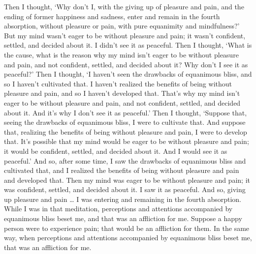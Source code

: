 \documentclass[12pt,openany]{book}%
\begin{document}
Then I thought, ‘Why don’t I, with the giving up of pleasure and pain, and the ending of former happiness and sadness, enter and remain in the fourth absorption, without pleasure or pain, with pure equanimity and mindfulness?’ But my mind wasn’t eager to be without pleasure and pain; it wasn’t confident, settled, and decided about it. I didn’t see it as peaceful. Then I thought, ‘What is the cause, what is the reason why my mind isn’t eager to be without pleasure and pain, and not confident, settled, and decided about it? Why don’t I see it as peaceful?’ Then I thought, ‘I haven’t seen the drawbacks of equanimous bliss, and so I haven’t cultivated that. I haven’t realized the benefits of being without pleasure and pain, and so I haven’t developed that. That’s why my mind isn’t eager to be without pleasure and pain, and not confident, settled, and decided about it. And it’s why I don’t see it as peaceful.’ Then I thought, ‘Suppose that, seeing the drawbacks of equanimous bliss, I were to cultivate that. And suppose that, realizing the benefits of being without pleasure and pain, I were to develop that. It’s possible that my mind would be eager to be without pleasure and pain; it would be confident, settled, and decided about it. And I would see it as peaceful.’ And so, after some time, I saw the drawbacks of equanimous bliss and cultivated that, and I realized the benefits of being without pleasure and pain and developed that. Then my mind was eager to be without pleasure and pain; it was confident, settled, and decided about it. I saw it as peaceful. And so, giving up pleasure and pain … I was entering and remaining in the fourth absorption. While I was in that meditation, perceptions and attentions accompanied by equanimous bliss beset me, and that was an affliction for me. Suppose a happy person were to experience pain; that would be an affliction for them. In the same way, when perceptions and attentions accompanied by equanimous bliss beset me, that was an affliction for me. 
\end{document}
